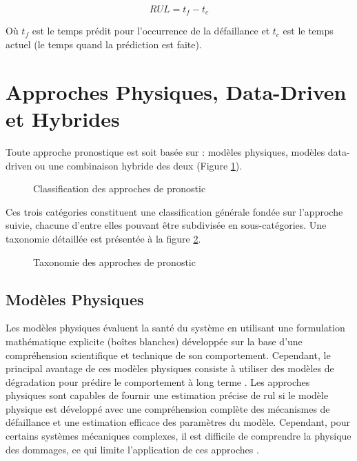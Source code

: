 \begin{equation}
    RUL = t_f-t_c
    \label{eq:rul}
\end{equation}

Où $t_f$ est le temps prédit pour l’occurrence de la défaillance et $t_c$ est le temps actuel (le temps quand la prédiction est faite).

\section{Approches Physiques, Data-Driven et Hybrides}
Toute approche pronostique est soit basée sur : modèles physiques, modèles data-driven ou une combinaison hybride des deux (Figure \ref{fig:prognostic-approaches-venn}).

\begin{figure}[h]
    \centering
	
    \caption{Classification des approches de pronostic}
    \label{fig:prognostic-approaches-venn}
\end{figure}

Ces trois catégories constituent une classification générale fondée sur l'approche suivie, chacune d'entre elles pouvant être subdivisée en sous-catégories. Une taxonomie détaillée est présentée à la figure \ref{fig:prognostic-approaches-tree}.
\begin{figure}[H]
	\resizebox{\textwidth}{!}{}
    \caption{Taxonomie des approches de pronostic}
    \label{fig:prognostic-approaches-tree}
\end{figure}

\subsection{Modèles Physiques}
Les modèles physiques évaluent la santé du système en utilisant une formulation mathématique explicite (boîtes blanches) développée sur la base d'une compréhension scientifique et technique de son comportement. Cependant, le principal avantage de ces modèles physiques consiste à utiliser des modèles de dégradation pour prédire le comportement à long terme \cite{Cubillo2016}. Les approches physiques sont capables de fournir une estimation précise de \acrshort{rul} si le modèle physique est développé avec une compréhension complète des mécanismes de défaillance et une estimation efficace des paramètres du modèle. Cependant, pour certains systèmes mécaniques complexes, il est difficile de comprendre la physique des dommages, ce qui limite l'application de ces approches \cite{Lei2018}.

